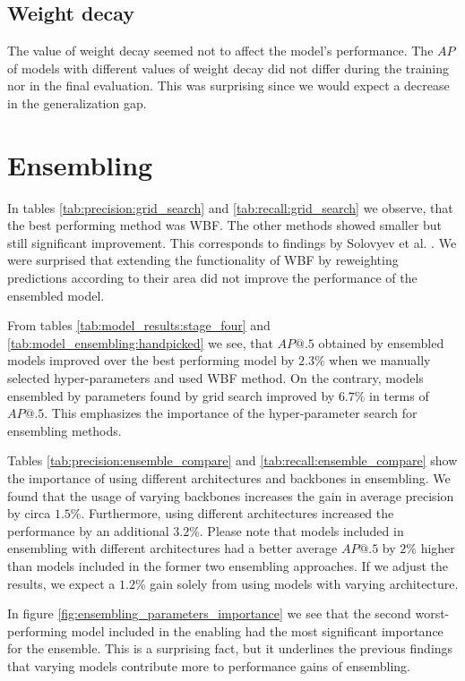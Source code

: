 \subsection{Weight decay}
The value of weight decay seemed not to affect the model's performance. The $AP$ of models with different values of weight decay did not differ during the training nor in the final evaluation. This was surprising since we would expect a decrease in the generalization gap.

\section{Ensembling}
In tables \ref{tab:precision:grid_search} and \ref{tab:recall:grid_search} we observe, that the best performing method was WBF. The other methods showed smaller but still significant improvement. This corresponds to findings by Solovyev et al. \cite{Solovyev2019}. We were surprised that extending the functionality of WBF by reweighting predictions according to their area did not improve the performance of the ensembled model.

From tables \ref{tab:model_results:stage_four} and \ref{tab:model_ensembling:handpicked} we see, that $AP@.5$ obtained by ensembled models improved over the best performing model by $2.3\%$ when we manually selected hyper-parameters and used WBF method. On the contrary, models ensembled by parameters found by grid search improved by $6.7\%$ in terms of $AP@.5$. This emphasizes the importance of the hyper-parameter search for ensembling methods.

Tables \ref{tab:precision:ensemble_compare} and \ref{tab:recall:ensemble_compare} show the importance of using different architectures and backbones in ensembling. We found that the usage of varying backbones increases the gain in average precision by circa $1.5\%$. Furthermore, using different architectures increased the performance by an additional $3.2\%$. Please note that models included in ensembling with different architectures had a better average $AP@.5$ by $2\%$ higher than models included in the former two ensembling approaches. If we adjust the results, we expect a $1.2\%$ gain solely from using models with varying architecture.

In figure \ref{fig:ensembling_parameters_importance} we see that the second worst-performing model included in the enabling had the most significant importance for the ensemble. This is a surprising fact, but it underlines the previous findings that varying models contribute more to performance gains of ensembling.

